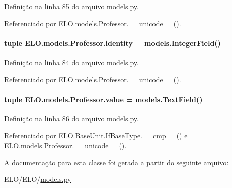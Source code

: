 Definição na linha \hyperlink{ELO_2models_8py_source_l00085}{85} do arquivo \hyperlink{ELO_2models_8py_source}{models.\-py}.



Referenciado por \hyperlink{classELO_1_1models_1_1Professor_aefc9d63d429e19ec3487a7879879f29d}{E\-L\-O.\-models.\-Professor.\-\_\-\-\_\-unicode\-\_\-\-\_\-()}.

\hypertarget{classELO_1_1models_1_1Professor_a314012619a14c0319c86ba52b6beeb2f}{
\paragraph[{identity}]{\setlength{\rightskip}{0pt plus 5cm}tuple E\-L\-O.\-models.\-Professor.\-identity = models.\-Integer\-Field()\hspace{0.3cm}{\ttfamily [static]}}}\label{classELO_1_1models_1_1Professor_a314012619a14c0319c86ba52b6beeb2f}


Definição na linha \hyperlink{ELO_2models_8py_source_l00084}{84} do arquivo \hyperlink{ELO_2models_8py_source}{models.\-py}.



Referenciado por \hyperlink{classELO_1_1models_1_1Professor_aefc9d63d429e19ec3487a7879879f29d}{E\-L\-O.\-models.\-Professor.\-\_\-\-\_\-unicode\-\_\-\-\_\-()}.

\hypertarget{classELO_1_1models_1_1Professor_abfa283169333876d02cf63886ca872e6}{
\paragraph[{value}]{\setlength{\rightskip}{0pt plus 5cm}tuple E\-L\-O.\-models.\-Professor.\-value = models.\-Text\-Field()\hspace{0.3cm}{\ttfamily [static]}}}\label{classELO_1_1models_1_1Professor_abfa283169333876d02cf63886ca872e6}


Definição na linha \hyperlink{ELO_2models_8py_source_l00086}{86} do arquivo \hyperlink{ELO_2models_8py_source}{models.\-py}.



Referenciado por \hyperlink{classELO_1_1BaseUnit_1_1IfBaseType_a69c338f6f1574bd3524e9d59ebc17a7c}{E\-L\-O.\-Base\-Unit.\-If\-Base\-Type.\-\_\-\-\_\-cmp\-\_\-\-\_\-()} e \hyperlink{classELO_1_1models_1_1Professor_aefc9d63d429e19ec3487a7879879f29d}{E\-L\-O.\-models.\-Professor.\-\_\-\-\_\-unicode\-\_\-\-\_\-()}.



A documentação para esta classe foi gerada a partir do seguinte arquivo\-:\begin{DoxyCompactItemize}
\item 
E\-L\-O/\-E\-L\-O/\hyperlink{ELO_2models_8py}{models.\-py}\end{DoxyCompactItemize}
